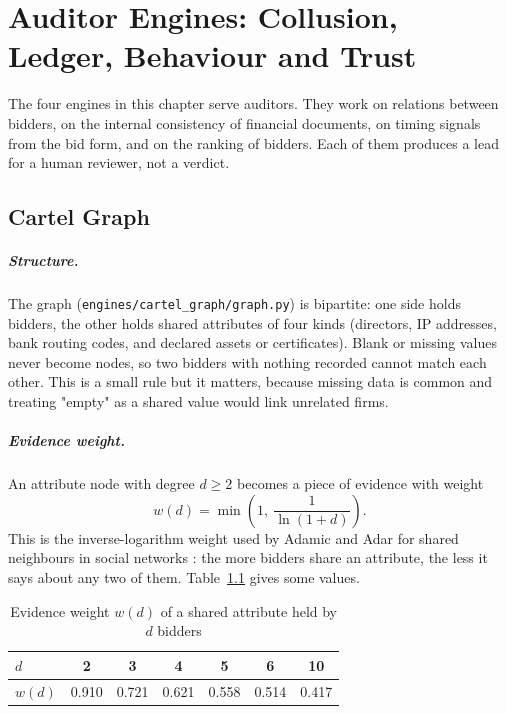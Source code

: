 \chapter{Auditor Engines: Collusion, Ledger, Behaviour and Trust}
\label{ch:engines2}

The four engines in this chapter serve auditors. They work on relations between bidders, on the internal consistency of financial documents, on timing signals from the bid form, and on the ranking of bidders. Each of them produces a lead for a human reviewer, not a verdict.

\section{Cartel Graph}
\label{sec:cartel}
\paragraph{Structure.} The graph (\texttt{engines/cartel\_graph/graph.py}) is bipartite: one side holds bidders, the other holds shared attributes of four kinds (directors, IP addresses, bank routing codes, and declared assets or certificates). Blank or missing values never become nodes, so two bidders with nothing recorded cannot match each other. This is a small rule but it matters, because missing data is common and treating "empty" as a shared value would link unrelated firms.

\paragraph{Evidence weight.} An attribute node with degree $d\ge 2$ becomes a piece of evidence with weight
\begin{equation}
w(d)=\min\!\left(1,\ \frac{1}{\ln(1+d)}\right).
\end{equation}
This is the inverse-logarithm weight used by Adamic and Adar for shared neighbours in social networks \cite{adamic2003friends}: the more bidders share an attribute, the less it says about any two of them. Table~\ref{tab:weights} gives some values.

\begin{table}[htbp]
\centering
\caption{Evidence weight $w(d)$ of a shared attribute held by $d$ bidders}
\label{tab:weights}
\small
\begin{tabular}{@{}lcccccc@{}}
\toprule
$d$ & 2 & 3 & 4 & 5 & 6 & 10 \\
\midrule
$w(d)$ & 0.910 & 0.721 & 0.621 & 0.558 & 0.514 & 0.417 \\
\bottomrule
\end{tabular}
\end{table}

